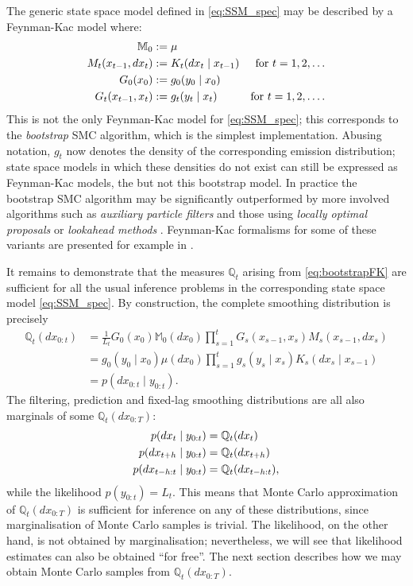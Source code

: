 The generic state space model defined in \eqref{eq:SSM_spec} may be described by a Feynman-Kac model where:
\begin{align}
\mathbb{M}_0 &:= \mu \notag\\
M_t (x_{t-1}, dx_t) &:= K_t (dx_t \mid x_{t-1}) & \text{for } t=1,2,\dots \notag\\
G_0 (x_0) &:= g_0 ( y_0 \mid x_0 ) \notag\\
G_t (x_{t-1}, x_t) &:= g_t( y_t \mid x_t ) & \text{for } t=1,2,\dots . \label{eq:bootstrapFK}
\end{align}
This is not the only Feynman-Kac model for \eqref{eq:SSM_spec}; this corresponds to the \emph{bootstrap} SMC algorithm, which is the simplest implementation.
Abusing notation, $g_t$ now denotes the density of the corresponding emission distribution; state space models in which these densities do not exist can still be expressed as Feynman-Kac models, the but not this bootstrap model.
In practice the bootstrap SMC algorithm may be significantly outperformed by more involved algorithms such as
\emph{auxiliary particle filters} \parencite{pitt1999, carpenter1999} and those using \emph{locally optimal proposals} \parencite[e.g.][]{doucet2000} or \emph{lookahead methods} \parencite{lin2013}.
Feynman-Kac formalisms for some of these variants are presented for example in \textcite[Section 5.1.2]{chopin2020}.

It remains to demonstrate that the measures $\mathbb{Q}_t$ arising from \eqref{eq:bootstrapFK} are sufficient for all the usual inference problems in the corresponding state space model \eqref{eq:SSM_spec}.
By construction, the complete smoothing distribution is precisely
\begin{align*}
\mathbb{Q}_t (dx_{0:t})
&= \frac{1}{L_t} G_0(x_0) \mathbb{M}_0(dx_0)
        \prod_{s=1}^t G_s(x_{s-1}, x_s) M_s(x_{s-1}, dx_s) \\
&= g_0(y_0 \mid x_0) \mu(dx_0) 
        \prod_{s=1}^t g_s(y_s \mid x_s) K_s(dx_s \mid x_{s-1}) \\
&= p(dx_{0:t} \mid y_{0:t}) . 
\end{align*}
The filtering, prediction and fixed-lag smoothing distributions are all also marginals of some $\mathbb{Q}_t(dx_{0:T})$:
\begin{align}
p(dx_t \mid y_{0:t}) &= \mathbb{Q}_t (dx_t) \notag\\
p(dx_{t+h} \mid y_{0:t}) &= \mathbb{Q}_t (dx_{t+h}) \label{eq:FK_marginals}\\
p(dx_{t-h:t} \mid y_{0:t}) &= \mathbb{Q}_t (dx_{t-h:t}) , \notag
\end{align}
while the likelihood $p(y_{0:t}) = L_t$.
This means that Monte Carlo approximation of $\mathbb{Q}_t(dx_{0:T})$ is sufficient for inference on any of these distributions, since marginalisation of Monte Carlo samples is trivial. The likelihood, on the other hand, is not obtained by marginalisation; nevertheless, we will see that likelihood estimates can also be obtained ``for free''. 
The next section describes how we may obtain Monte Carlo samples from $\mathbb{Q}_t(dx_{0:T})$.





